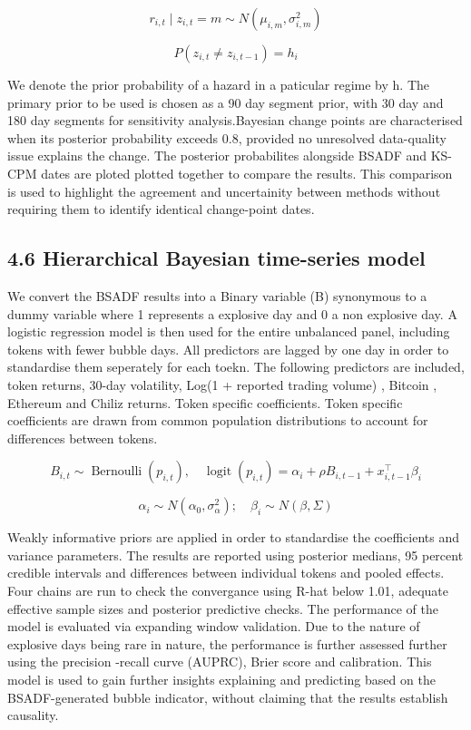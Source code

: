\documentclass[11pt,a4paper,onecolumn]{article}
\begin{document}
\[
r_{i,t}\mid z_{i,t}=m\sim N(\mu_{i,m},\sigma_{i,m}^{2})
\]

\[
P(z_{i,t}\neq z_{i,t-1})=h_i
\]

We denote the prior probability of a hazard in a paticular regime by h. The primary prior to be used is chosen as a 90 day segment prior, with 30 day and 180 day segments for sensitivity analysis.Bayesian change points are characterised when its posterior probability exceeds 0.8, provided no unresolved data-quality issue explains the change. The posterior probabilites alongside BSADF and KS-CPM dates are ploted plotted together to compare the results. This comparison is used to highlight the agreement and uncertainity between methods without requiring them to identify identical change-point dates.

\subsection{4.6 Hierarchical Bayesian time-series model}

We convert the BSADF results into a Binary variable (B) synonymous to a dummy variable where 1 represents a explosive day and 0 a non explosive day. A logistic regression model is then used for the entire unbalanced panel, including tokens with fewer bubble days. All predictors are lagged by one day in order to standardise them seperately for each toekn. The following predictors are included, token returns, 30-day volatility, Log(1 + reported trading volume) , Bitcoin , Ethereum and Chiliz returns. Token specific coefficients. Token specific coefficients are drawn from common population distributions to account for differences between tokens.

\[
B_{i,t}\sim\operatorname{Bernoulli}(p_{i,t}),\quad\operatorname{logit}(p_{i,t})=\alpha_i+\rho B_{i,t-1}+x_{i,t-1}^{\top}\beta_i
\]

\[
\alpha_i\sim N(\alpha_0,\sigma_{\alpha}^{2});\quad\beta_i\sim N(\beta,\Sigma)
\]

Weakly informative priors are applied in order to standardise the coefficients and variance parameters. The results are reported using posterior medians, 95 percent credible intervals and differences between individual tokens and pooled effects. Four chains are run to check the convergance using R-hat below 1.01, adequate effective sample sizes and posterior predictive checks. The performance of the model is evaluated via expanding window validation. Due to the nature of explosive days being rare in nature, the performance is further assessed further using the precision -recall curve (AUPRC), Brier score and calibration. This model is used to gain further insights explaining and predicting based on the BSADF-generated bubble indicator, without claiming that the results establish causality.
\end{document}
